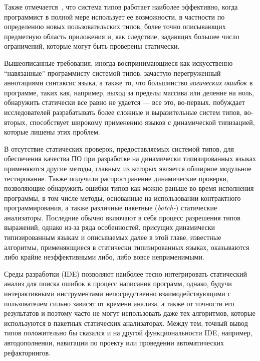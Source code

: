 Также отмечается~\cite{Pierce2002}, что система типов работает наиболее
эффективно, когда программист в полной мере использует ее возможности, в
частности по определению новых пользовательских типов, более точно описывающих
предметную область приложения и, как следствие, задающих большее число
ограничений, которые могут быть проверены статически.


Вышеописанные требования, иногда воспринимающиеся как искусственно ``навязанные''
программисту системой типов, зачастую перегруженный аннотациями синтаксис языка,
а также то, что большинство \emph{логических ошибок} в программе, таких как, например,
выход за пределы массива или деление на ноль, обнаружить статически все равно не
удается --- все это, во-первых, побуждает исследователей разрабатывать более
сложные и выразительные систем типов, во-вторых, способствует широкому
применению языков с динамической типизацией, которые лишены этих проблем.

В отсутствие статических проверок, предоставляемых системой типов, для
обеспечения качества ПО при разработке на динамически типизированных языках
применяются другие методы, главным из которых является обширное модульное
тестирование. Также получили распространение динамические проверки, позволяющие
обнаружить ошибки типов как можно раньше во время исполнения программы, в том
числе методы, основанные на использовании контрактного программирования, а также
различные пакетные (\emph{batch-}) статические анализаторы. Последние обычно
включают в себя процесс разрешения типов выражений, однако из-за ряда
особенностей, присущих динамически типизированным языкам и описываемых далее в
этой главе, известные алгоритмы, применяющиеся в статически типизированных
языках, оказываются либо крайне неэффективными либо, либо вовсе неприменимыми.

Среды разработки (IDE) позволяют наиболее тесно интегрировать статический анализ
для поиска ошибок в процесс написания программ, однако, будучи
интерактивными инструментами непосредственно взаимодействующими с пользователем
сильно зависят от времени анализа, а также от точности его результатов и поэтому
часто не могут использовать даже тех алгоритмов, которые используются в пакетных
статических анализаторах. Между тем, точный вывод типов положительно бы сказался
и на другой функциональности IDE, например, автодополнении, навигации по проекту
или проведении автоматических рефакторингов.

